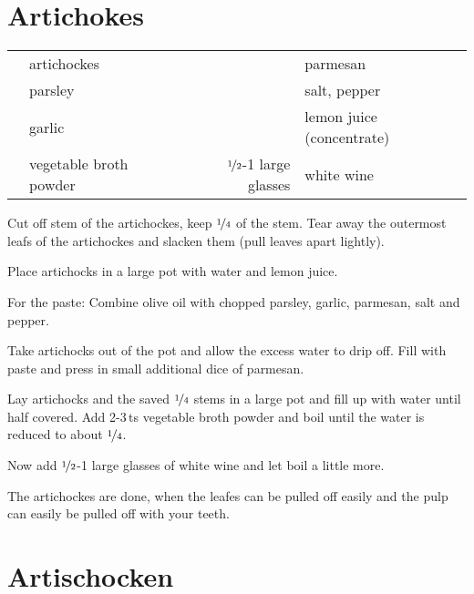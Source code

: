\section{Artichokes}

\begin{centering}

\end{centering}

\begin{table}[H]
  \centering
  \begin{tabular*}{1\textwidth}{rlrl}
& artichockes & & parmesan \\
 & parsley & & salt, pepper \\
 & garlic & & lemon juice (concentrate) \\
 & vegetable broth powder & $\nicefrac{1}{2}$-1 large glasses & white wine \\
\end{tabular*}
\end{table}

\begin{Notes}
\item Cut off stem of the artichockes, keep $\nicefrac{1}{4}$ of the stem. Tear away the outermost leafs of the artichockes and slacken them (pull leaves apart lightly).
\item Place artichocks in a large pot with water and lemon juice.
\item For the paste: Combine olive oil with chopped parsley, garlic, parmesan, salt and pepper.
\item Take artichocks out of the pot and allow the excess water to drip off. Fill with paste and press in small additional dice of parmesan.
\item Lay artichocks and the saved $\nicefrac{1}{4}$ stems in a large pot and fill up with water until half covered. Add 2-3\,ts vegetable broth powder and boil until the water is reduced to about $\nicefrac{1}{4}$.
\item Now add $\nicefrac{1}{2}$-1 large glasses of white wine and let boil a little more.
  \item The artichockes are done, when the leafes can be pulled off easily and the pulp can easily be pulled off with your teeth.
\end{Notes}


\section*{Artischocken}

